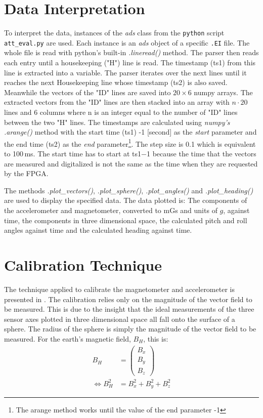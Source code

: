 \section{Data Interpretation \label{sec:meth:data_interpretation}}
To interpret the data, instances of the \textit{ads} class from the \verb|python| script \verb|att_eval.py| are used. Each instance is an \textit{ads} object of a specific \verb|.EI| file. The whole file is read with python's built-in \textit{.lineread()} method. The parser then reads each entry until a housekeeping ("H") line is read. The timestamp (ts1) from this line is extracted into a variable. The parser iterates over the next lines until it reaches the next Housekeeping line whose timestamp (ts2) is also saved. Meanwhile the vectors of the "ID" lines are saved into $20\times6$ numpy arrays. The extracted vectors from the "ID" lines are then stacked into an array with $n\cdot20$ lines and 6 columns where n is an integer equal to the number of "ID" lines between the two "H" lines. The timestamps are calculated using \textit{numpy's .arange()} method with the start time (ts1) -1 [second] as the \textit{start} parameter and the end time (ts2) as the \textit{end} parameter\footnote{The arange method works until the value of the end parameter -1}. The step size is 0.1 which is equivalent to 100\,ms. The start time has to start at ts1$-$1 because the time that the vectors are measured and digitalized is not the same as the time when they are requested by the \ac{FPGA}.

The methods \textit{.plot\_vectors()}, \textit{.plot\_sphere()}, \textit{.plot\_angles()} and \textit{.plot\_heading()} are used to display the specified data. The data plotted is: The components of the accelerometer and magnetometer, converted to mGs and units of $g$, against time, the components in three dimensional space, the calculated pitch and roll angles against time and the calculated heading against time.

\section{Calibration Technique \label{sec:meth:calibration_technique}}
The technique applied to calibrate the magnetometer and accelerometer is presented in \cite{non-orthonogality}. The calibration relies only on the magnitude of the vector field to be measured. This is due to the insight that the ideal measurements of the three sensor axes plotted in three dimensional space all fall onto the surface of a sphere. The radius of the sphere is simply the magnitude of the vector field to be measured. For the earth's magnetic field, $B_H$, this is:
\begin{align}
    B_H&=\begin{pmatrix} B_x \\ B_y \\ B_z \end{pmatrix} \\
    \iff B_H^2& = B_x^2+B_y^2+B_z^2 
    \label{eq:regular_sphere}
\end{align}

